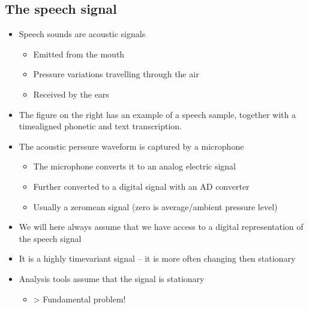 \documentclass[letterpaper,10pt,english]{jupyterBook}
\begin{document}
\subsection{The speech signal}
\label{\detokenize{Representations/Short-time_analysis:the-speech-signal}}
\sphinxAtStartPar
{}
\begin{itemize}
\item {} 
\sphinxAtStartPar
Speech sounds are acoustic signals
\begin{itemize}
\item {} 
\sphinxAtStartPar
Emitted from the mouth

\item {} 
\sphinxAtStartPar
Pressure variations travelling through the air

\item {} 
\sphinxAtStartPar
Received by the ears

\end{itemize}

\item {} 
\sphinxAtStartPar
The figure on the right has an example of a speech sample, together with a time\sphinxhyphen{}aligned phonetic and text transcription.

\item {} 
\sphinxAtStartPar
The acoustic perssure waveform is captured by a microphone
\begin{itemize}
\item {} 
\sphinxAtStartPar
The microphone converts it to an analog electric signal

\item {} 
\sphinxAtStartPar
Further converted to a digital signal with an AD converter

\item {} 
\sphinxAtStartPar
Usually a zero\sphinxhyphen{}mean signal (zero is average/ambient pressure level)

\end{itemize}

\item {} 
\sphinxAtStartPar
We will here always assume that we have access to a digital representation of the speech signal

\item {} 
\sphinxAtStartPar
It is a highly time\sphinxhyphen{}variant signal – it is more often changing then stationary

\item {} 
\sphinxAtStartPar
Analysis tools assume that the signal is stationary
\begin{itemize}
\item {} 
\sphinxAtStartPar
\sphinxhyphen{}> Fundamental problem!


\end{itemize}
\end{itemize}
\end{document}
